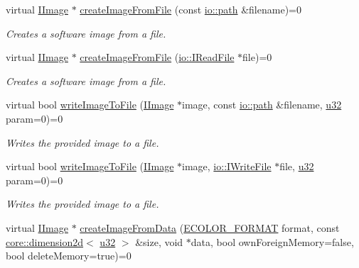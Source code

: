 \begin{DoxyCompactItemize}
virtual \hyperlink{classirr_1_1video_1_1IImage}{I\+Image} $\ast$ \hyperlink{classirr_1_1video_1_1IVideoDriver_ac5b4c13f64d96d27fa27f52b68f77b8c}{create\+Image\+From\+File} (const \hyperlink{namespaceirr_1_1io_ab1bdc45edb3f94d8319c02bc0f840ee1}{io\+::path} \&filename)=0
\begin{DoxyCompactList}\small\item\em Creates a software image from a file. \end{DoxyCompactList}\item 
virtual \hyperlink{classirr_1_1video_1_1IImage}{I\+Image} $\ast$ \hyperlink{classirr_1_1video_1_1IVideoDriver_a322c41fa08c1da9de4633cf8a1e68607}{create\+Image\+From\+File} (\hyperlink{classirr_1_1io_1_1IReadFile}{io\+::\+I\+Read\+File} $\ast$file)=0
\begin{DoxyCompactList}\small\item\em Creates a software image from a file. \end{DoxyCompactList}\item 
virtual bool \hyperlink{classirr_1_1video_1_1IVideoDriver_a407d6a1483f995060035340e0a92ce9b}{write\+Image\+To\+File} (\hyperlink{classirr_1_1video_1_1IImage}{I\+Image} $\ast$image, const \hyperlink{namespaceirr_1_1io_ab1bdc45edb3f94d8319c02bc0f840ee1}{io\+::path} \&filename, \hyperlink{namespaceirr_a0416a53257075833e7002efd0a18e804}{u32} param=0)=0
\begin{DoxyCompactList}\small\item\em Writes the provided image to a file. \end{DoxyCompactList}\item 
virtual bool \hyperlink{classirr_1_1video_1_1IVideoDriver_ae12c362cfbc92a7c59b434666c8436c0}{write\+Image\+To\+File} (\hyperlink{classirr_1_1video_1_1IImage}{I\+Image} $\ast$image, \hyperlink{classirr_1_1io_1_1IWriteFile}{io\+::\+I\+Write\+File} $\ast$file, \hyperlink{namespaceirr_a0416a53257075833e7002efd0a18e804}{u32} param=0)=0
\begin{DoxyCompactList}\small\item\em Writes the provided image to a file. \end{DoxyCompactList}\item 
virtual \hyperlink{classirr_1_1video_1_1IImage}{I\+Image} $\ast$ \hyperlink{classirr_1_1video_1_1IVideoDriver_a425d60f2fcad42d8a79c33c587f41a06}{create\+Image\+From\+Data} (\hyperlink{namespaceirr_1_1video_a1d5e487888c32b1674a8f75116d829ed}{E\+C\+O\+L\+O\+R\+\_\+\+F\+O\+R\+M\+AT} format, const \hyperlink{classirr_1_1core_1_1dimension2d}{core\+::dimension2d}$<$ \hyperlink{namespaceirr_a0416a53257075833e7002efd0a18e804}{u32} $>$ \&size, void $\ast$data, bool own\+Foreign\+Memory=false, bool delete\+Memory=true)=0

\end{DoxyCompactItemize}
